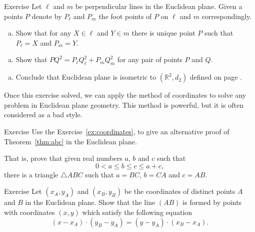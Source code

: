 \begin{thm}{Exercise}\label{ex:coordinates} 
Let $\ell$ and $m$ be perpendicular lines in the Euclidean plane.
Given a points $P$  denote by $P_\ell$ and $P_m$ the foot points of $P$ on $\ell$ and $m$ correspondingly.

\begin{enumerate}[(a)]
\item Show that for any $X\in \ell$ and $Y\in m$ there is unique point $P$ such that $P_\ell=X$ and $P_m=Y$.
\end{enumerate}

\begin{enumerate}[(a)]\addtocounter{enumi}{1}
\item
Show that 
$PQ^2=P_\ell Q_\ell^2+P_mQ_m^2$
for any pair of points $P$ and $Q$.
\end{enumerate}

\begin{enumerate}[(a)]\addtocounter{enumi}{2}
\item Conclude that Euclidean plane is isometric to $(\mathbb{R}^2,d_2)$ defined on page \pageref{def:d_2}.
\end{enumerate}
\end{thm}

Once this exercise solved, we can apply 
the method of coordinates
to solve any problem in Euclidean plane geometry.
This method is powerful, 
but it is often considered as a bad style.

\begin{thm}{Exercise}\label{ex:abc}
Use the Exercise~\ref{ex:coordinates},
to give an alternative proof of Theorem~\ref{thm:abc} in the Euclidean plane.

That is, prove that given real numbers $a$, $b$ and $c$ such that 
 $$0<a\le b\le c\le a+c,$$
there is a triangle $\triangle ABC$
such that $a=BC$, $b=CA$ and $c=AB$.
\end{thm} 

\begin{thm}{Exercise}\label{ex:line-coord}
Let $(x_A,y_A)$ and $(x_B,y_B)$ be the coordinates of distinct points $A$ and $B$ in the Euclidean plane.
Show that the line $(AB)$ is formed by points with coordinates $(x,y)$ which satisfy the following equation
\[(x-x_A)\cdot (y_B-y_A)=(y-y_A)\cdot (x_B-x_A).\]

\end{thm}










